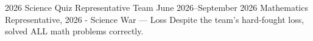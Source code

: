 
\cvactivitywithresult
  {2026  Science Quiz Representative Team}
  {June 2026--September 2026}
  {Mathematics Representative, 2026 - Science War --- Loss}
  {Despite the team's hard-fought loss, solved ALL math problems correctly.}

